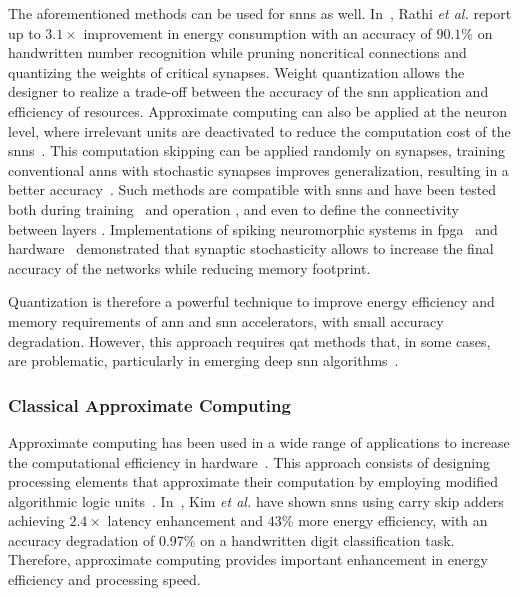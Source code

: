 The aforementioned methods can be used for \glspl{snn} as well. In~\cite{rathi2018stdp}, Rathi \textit{et al.} report up to $3.1\times$ improvement in energy consumption with an accuracy of $90.1\%$ on handwritten number recognition while pruning noncritical connections and quantizing the weights of critical synapses. Weight quantization allows the designer to realize a trade-off between the accuracy of the \gls{snn} application and efficiency of resources. Approximate computing can also be applied at the neuron level, where irrelevant units are deactivated to reduce the computation cost of the \glspl{snn}~\cite{sen2017approximate}. This computation skipping can be applied randomly on synapses, training conventional \glspl{ann} with stochastic synapses improves generalization, resulting in a better accuracy~\cite{srivastava2014dropout, wan2013regularization}. Such methods are compatible with \glspl{snn} and have been tested both during training~\cite{neftci2016stochastic, srinivasan2016magnetic} and operation \cite{buesing2011neural}, and even to define the connectivity between layers \cite{bellec2017deep, chen20184096}. Implementations of spiking neuromorphic systems in \gls{fpga}~\cite{sheik2016synaptic} and hardware~\cite{jerry2017ultra} demonstrated that synaptic stochasticity allows to increase the final accuracy of the networks while reducing memory footprint.

Quantization is therefore a powerful technique to improve energy efficiency and memory requirements of \gls{ann} and \gls{snn} accelerators, with small accuracy degradation. However, this approach requires \gls{qat} methods that, in some cases, are problematic, particularly in emerging deep \gls{snn} algorithms~\cite{zhang2018survey}.

\subsubsection{Classical Approximate Computing}
Approximate computing has been used in a wide range of applications to increase the computational efficiency in hardware~\cite{han2013approximate}. This approach consists of designing processing elements that approximate their computation by employing modified algorithmic logic units~\cite{han2013approximate}. In~\cite{kim2013energy}, Kim \textit{et al.} have shown \glspl{snn} using carry skip adders achieving $2.4\times$ latency enhancement and $43\%$ more energy efficiency, with an accuracy degradation of 0.97\% on a handwritten digit classification task. Therefore, approximate computing provides important enhancement in energy efficiency and processing speed.

